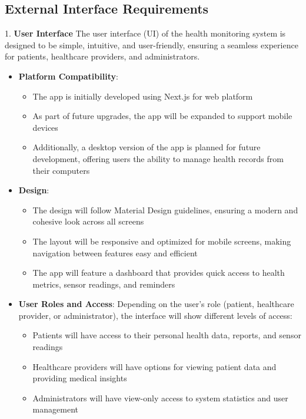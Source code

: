 \subsection{External Interface Requirements}

1. \textbf{User Interface}
The user interface (UI) of the health monitoring system is designed to be simple, intuitive, and user-friendly, ensuring a seamless experience for patients, healthcare providers, and administrators.

\begin{itemize}
    \item \textbf{Platform Compatibility}:
    \begin{itemize}
        \item The app is initially developed using Next.js for web platform
        \item As part of future upgrades, the app will be expanded to support mobile devices
        \item Additionally, a desktop version of the app is planned for future development, offering users the ability to manage health records from their computers
    \end{itemize}

    \item \textbf{Design}:
    \begin{itemize}
        \item The design will follow Material Design guidelines, ensuring a modern and cohesive look across all screens
        \item The layout will be responsive and optimized for mobile screens, making navigation between features easy and efficient
        \item The app will feature a dashboard that provides quick access to health metrics, sensor readings, and reminders
    \end{itemize}

    \item \textbf{User Roles and Access}:
    Depending on the user's role (patient, healthcare provider, or administrator), the interface will show different levels of access:
    \begin{itemize}
        \item Patients will have access to their personal health data, reports, and sensor readings
        \item Healthcare providers will have options for viewing patient data and providing medical insights
        \item Administrators will have view-only access to system statistics and user management
    \end{itemize}
\end{itemize}

